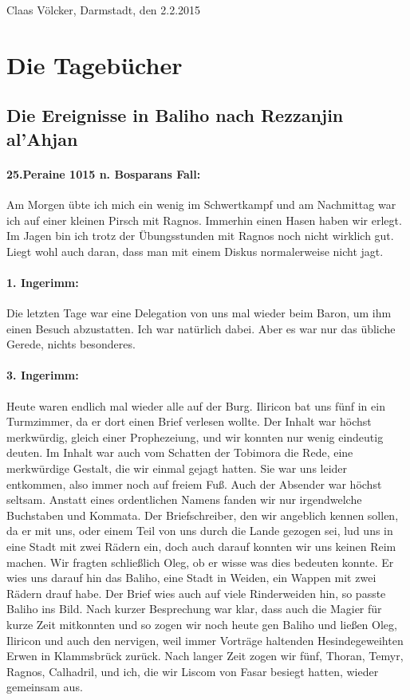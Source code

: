 \begin{flushright}
Claas Völcker, Darmstadt, den 2.2.2015
\end{flushright}


\section{Die Tagebücher}


\subsection{Die Ereignisse in Baliho nach Rezzanjin al'Ahjan}

\paragraph{25.Peraine 1015 n. Bosparans Fall:} Am Morgen übte ich mich ein wenig im Schwertkampf und am Nachmittag war ich auf einer kleinen Pirsch mit Ragnos. Immerhin einen Hasen haben wir erlegt. Im Jagen bin ich trotz der Übungsstunden mit Ragnos noch nicht wirklich gut. Liegt wohl auch daran, dass man mit einem Diskus normalerweise nicht jagt.

\paragraph{1. Ingerimm:} Die letzten Tage war eine Delegation von uns mal wieder beim Baron, um ihm einen Besuch abzustatten. Ich war natürlich dabei. Aber es war nur das übliche Gerede, nichts besonderes.

\paragraph{3. Ingerimm:} Heute waren endlich mal wieder alle auf der Burg. Iliricon bat uns fünf in ein Turmzimmer, da er dort einen Brief verlesen wollte. Der Inhalt war höchst merkwürdig, gleich einer Prophezeiung, und wir konnten nur wenig eindeutig deuten. Im Inhalt war auch vom Schatten der Tobimora die Rede, eine merkwürdige Gestalt, die wir einmal gejagt hatten. Sie war uns leider entkommen, also immer noch auf freiem Fuß. Auch der Absender war höchst seltsam. Anstatt eines ordentlichen Namens fanden wir nur irgendwelche Buchstaben und Kommata. Der Briefschreiber, den wir angeblich kennen sollen, da er mit uns, oder einem Teil von uns durch die Lande gezogen sei, lud uns in eine Stadt mit zwei Rädern ein, doch auch darauf konnten wir uns keinen Reim machen. Wir fragten schließlich Oleg, ob er wisse was dies bedeuten konnte. Er wies uns darauf hin das Baliho, eine Stadt in Weiden, ein Wappen mit zwei Rädern drauf habe. Der Brief wies auch auf viele Rinderweiden hin, so passte Baliho ins Bild. Nach kurzer Besprechung war klar, dass auch die Magier für kurze Zeit mitkonnten und so zogen wir noch heute gen Baliho und ließen Oleg, Iliricon und auch den nervigen, weil immer Vorträge haltenden Hesindegeweihten Erwen in Klammsbrück zurück. Nach langer Zeit zogen wir fünf, Thoran, Temyr, Ragnos, Calhadril, und ich, die wir Liscom von Fasar besiegt hatten, wieder gemeinsam aus.

